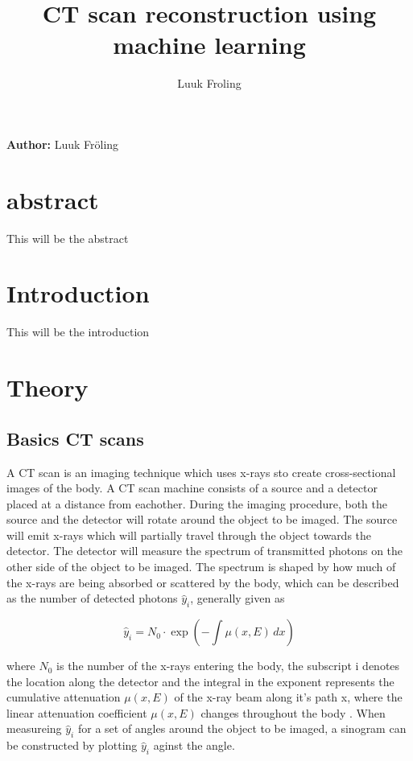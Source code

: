 \documentclass[9pt,Preprint]{lapreprint}
\title{CT scan reconstruction using machine learning}
\author[]{Luuk Froling}
\begin{document}
\maketitle


\textbf{Author:} Luuk Fröling

\section{abstract}

This will be the abstract

\section{Introduction}

This will be the introduction

\section{Theory}

\subsection{Basics CT scans}

A CT scan is an imaging technique which uses x-rays sto create cross-sectional images of the body. A CT scan machine consists of a source and a detector placed at a distance from eachother. During the imaging procedure, both the source and the detector will rotate around the object to be imaged. The source will emit x-rays which will partially travel through the object towards the detector. The detector will measure the spectrum of transmitted photons on the other side of the object to be imaged. The spectrum is shaped by how much of the x-rays are being absorbed or scattered by the body, which can be described as the number of detected photons $\hat{y}_i$, generally given as

\begin{equation}
\label{first }
\hat{y}_i  = N_0 \cdot \exp\left(-\int \mu(x, E) \, dx\right)
\end{equation}

where $N_0$ is the number of the x-rays entering the body, the subscript i denotes the location along the detector and the integral in the exponent represents the cumulative attenuation $\mu(x, E)$ of the x-ray beam along it's path x, where the linear attenuation coefficient $\mu(x, E)$ changes throughout the body \parencite{kamalian2016ct_principles}. When measureing $\hat{y}_i$ for a set of angles around the object to be imaged, a sinogram can be constructed by plotting $\hat{y}_i$ aginst the angle.
\end{document}
